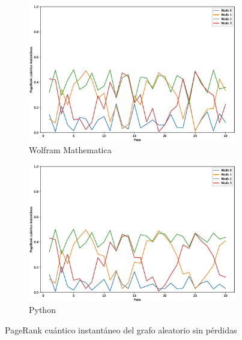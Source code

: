 \begin{figure}[H]
    \centering
    \begin{subfigure}[m]{0.45\textwidth}
        \centering
        \includegraphics[width=0.9\linewidth]{img/any-inst-M.eps}
        \caption{Wolfram Mathematica}
    \end{subfigure}
    \begin{subfigure}[m]{0.45\textwidth}
        \centering
        \includegraphics[width=0.9\linewidth]{img/any-inst-lossless.eps}
        \caption{Python}
    \end{subfigure}
    \caption[PageRank cuántico instantáneo del grafo aleatorio sin pérdidas]{PageRank cuántico instantáneo del grafo aleatorio sin pérdidas}
    \label{fig:instanylossless}
\end{figure}


